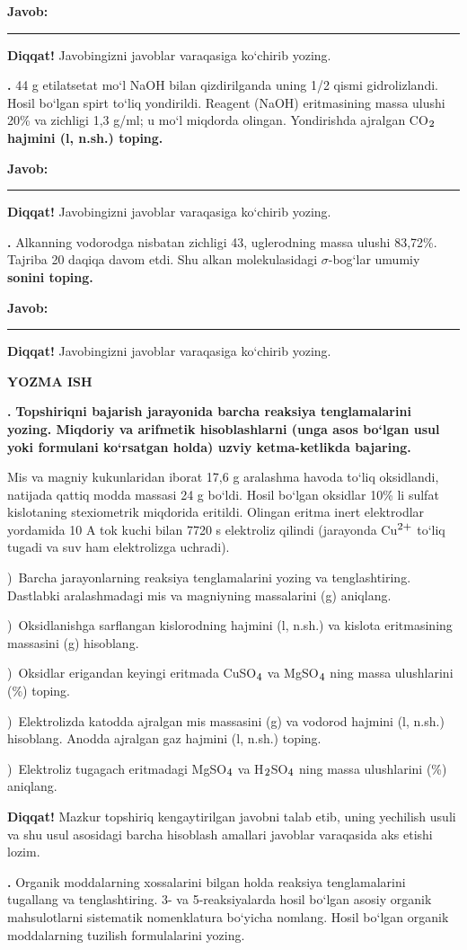 \documentclass[11pt,a4paper]{article}
\renewcommand{\textsubscript}[1]{\ensuremath{_{\text{\fontsize{8}{8}\selectfont #1}}}}
\renewcommand{\textsuperscript}[1]{\ensuremath{^{\text{\fontsize{8}{8}\selectfont #1}}}}
\newcommand{\qn}[1]{\textbf{\fontsize{11.5}{13}\selectfont #1}}
\newcommand{\qsep}{\par\vspace{13pt}}
\newcommand{\diqqat}[1]{\par\smallskip\noindent\textbf{Diqqat!} #1\par\medskip}
\newcommand{\javob}{\par\nopagebreak[4]\smallskip\noindent\textbf{Javob:} \rule[-2pt]{7.5cm}{0.4pt}\par\smallskip\noindent\textbf{Diqqat!} Javobingizni javoblar varaqasiga ko`chirib yozing.\par\medskip}
\begin{document}
\javob\qsep
\noindent\qn{39.} 44 g etilatsetat mo`l NaOH bilan qizdirilganda uning 1/2 qismi gidrolizlandi. Hosil bo`lgan spirt to`liq yondirildi. Reagent (NaOH) eritmasining massa ulushi 20\% va zichligi 1,3 g/ml; u mo`l miqdorda olingan. Yondirishda ajralgan CO\textsubscript{2} \textbf{hajmini (l, n.sh.) toping.}
\javob\qsep
\noindent\qn{40.} Alkanning vodorodga nisbatan zichligi 43, uglerodning massa ulushi 83,72\%. Tajriba 20 daqiqa davom etdi. Shu alkan molekulasidagi $\sigma$-bog`lar umumiy \textbf{sonini toping.}
\javob\qsep
\par\bigskip\begin{center}\textbf{\fontsize{13}{15}\selectfont YOZMA ISH}\end{center}
\noindent\qn{41.} \textbf{Topshiriqni bajarish jarayonida barcha reaksiya tenglamalarini yozing. Miqdoriy va arifmetik hisoblashlarni (unga asos bo`lgan usul yoki formulani ko`rsatgan holda) uzviy ketma-ketlikda bajaring.}\par\smallskip
Mis va magniy kukunlaridan iborat 17,6 g aralashma havoda to`liq oksidlandi, natijada qattiq modda massasi 24 g bo`ldi. Hosil bo`lgan oksidlar 10\% li sulfat kislotaning stexiometrik miqdorida eritildi. Olingan eritma inert elektrodlar yordamida 10 A tok kuchi bilan 7720 s elektroliz qilindi (jarayonda Cu\textsuperscript{2+} to`liq tugadi va suv ham elektrolizga uchradi).\par
{})\ Barcha jarayonlarning reaksiya tenglamalarini yozing va tenglashtiring. Dastlabki aralashmadagi mis va magniyning massalarini (g) aniqlang.\par
{})\ Oksidlanishga sarflangan kislorodning hajmini (l, n.sh.) va kislota eritmasining massasini (g) hisoblang.\par
{})\ Oksidlar erigandan keyingi eritmada CuSO\textsubscript{4} va MgSO\textsubscript{4} ning massa ulushlarini (\%) toping.\par
{})\ Elektrolizda katodda ajralgan mis massasini (g) va vodorod hajmini (l, n.sh.) hisoblang. Anodda ajralgan gaz hajmini (l, n.sh.) toping.\par
{})\ Elektroliz tugagach eritmadagi MgSO\textsubscript{4} va H\textsubscript{2}SO\textsubscript{4} ning massa ulushlarini (\%) aniqlang.\par
\diqqat{Mazkur topshiriq kengaytirilgan javobni talab etib, uning yechilish usuli va shu usul asosidagi barcha hisoblash amallari javoblar varaqasida aks etishi lozim.}\qsep
\noindent\qn{42.} Organik moddalarning xossalarini bilgan holda reaksiya tenglamalarini tugallang va tenglashtiring. 3- va 5-reaksiyalarda hosil bo`lgan asosiy organik mahsulotlarni sistematik nomenklatura bo`yicha nomlang. Hosil bo`lgan organik moddalarning tuzilish formulalarini yozing.\par
\end{document}
